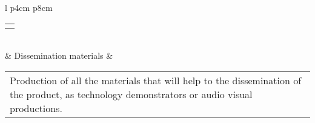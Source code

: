 \begin{longtable}[H]{l p{4cm} p{8cm}}
\begin{tabular}[c]{@{}l@{}}
\begin{minipage}[t]{\linewidth}
		\end{minipage} \end{tabular}
	\\  & Dissemination materials & 
				\begin{tabular}[c]{@{}l@{}}\begin{minipage}[t]{\linewidth}
		Production of all the materials that will help to the dissemination of the product, as technology demonstrators or audio visual productions.
		\end{minipage} \end{tabular}
	\\ \bottomrule[2pt]
\end{longtable}